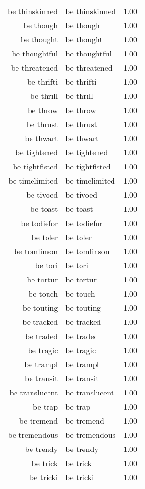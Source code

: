 \begin{table}[ht]
\begin{tabular}{rlr}
  be thinskinned & be thinskinned & 1.00 \\ 
  be though & be though & 1.00 \\ 
  be thought & be thought & 1.00 \\ 
  be thoughtful & be thoughtful & 1.00 \\ 
  be threatened & be threatened & 1.00 \\ 
  be thrifti & be thrifti & 1.00 \\ 
  be thrill & be thrill & 1.00 \\ 
  be throw & be throw & 1.00 \\ 
  be thrust & be thrust & 1.00 \\ 
  be thwart & be thwart & 1.00 \\ 
  be tightened & be tightened & 1.00 \\ 
  be tightfisted & be tightfisted & 1.00 \\ 
  be timelimited & be timelimited & 1.00 \\ 
  be tivoed & be tivoed & 1.00 \\ 
  be toast & be toast & 1.00 \\ 
  be todiefor & be todiefor & 1.00 \\ 
  be toler & be toler & 1.00 \\ 
  be tomlinson & be tomlinson & 1.00 \\ 
  be tori & be tori & 1.00 \\ 
  be tortur & be tortur & 1.00 \\ 
  be touch & be touch & 1.00 \\ 
  be touting & be touting & 1.00 \\ 
  be tracked & be tracked & 1.00 \\ 
  be traded & be traded & 1.00 \\ 
  be tragic & be tragic & 1.00 \\ 
  be trampl & be trampl & 1.00 \\ 
  be transit & be transit & 1.00 \\ 
  be translucent & be translucent & 1.00 \\ 
  be trap & be trap & 1.00 \\ 
  be tremend & be tremend & 1.00 \\ 
  be tremendous & be tremendous & 1.00 \\ 
  be trendy & be trendy & 1.00 \\ 
  be trick & be trick & 1.00 \\ 
  be tricki & be tricki & 1.00 \\ 

\end{tabular}
\end{table}
